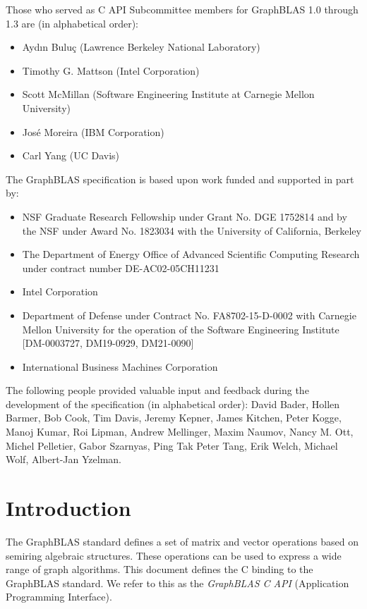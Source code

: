 \documentclass[11pt]{extbook}
\begin{document}
Those who served as C API Subcommittee members for GraphBLAS 1.0 through 1.3 are (in alphabetical order):
\begin{itemize}
\item Ayd\i n Bulu\c{c} (Lawrence Berkeley National Laboratory)
\item Timothy G. Mattson (Intel Corporation)
\item Scott McMillan (Software Engineering Institute at Carnegie Mellon University)
\item Jos\'e Moreira (IBM Corporation)
\item Carl Yang (UC Davis)
\end{itemize}


The GraphBLAS specification is based upon work funded and supported in part by:
\begin{itemize}
\item NSF Graduate Research Fellowship under Grant No. DGE 1752814 and by the NSF under Award No. 1823034 with the University of California, Berkeley
\item The Department of Energy Office of Advanced Scientific Computing Research under contract number DE-AC02-05CH11231
\item Intel Corporation
\item Department of Defense under Contract No. FA8702-15-D-0002 with Carnegie Mellon University for the operation of the Software Engineering Institute [DM-0003727, DM19-0929, DM21-0090]
\item International Business Machines Corporation
\end{itemize}

The following people provided valuable input and feedback during the development of the specification (in alphabetical order): David Bader,
Hollen Barmer, Bob Cook, Tim Davis, Jeremy Kepner, James Kitchen, Peter Kogge, Manoj Kumar, Roi Lipman, Andrew Mellinger, 
Maxim Naumov, Nancy M. Ott, Michel Pelletier, Gabor Szarnyas, Ping Tak Peter Tang, Erik Welch, Michael Wolf, Albert-Jan Yzelman.
\vfill
\pagebreak


\chapter{Introduction}

The GraphBLAS standard defines a set of matrix and vector operations 
based on semiring algebraic structures.  These operations can be used
to express a wide range of graph algorithms.  This document 
defines the C binding to the GraphBLAS standard.  We refer to 
this as the {\it GraphBLAS C API} (Application Programming Interface).   
\end{document}
